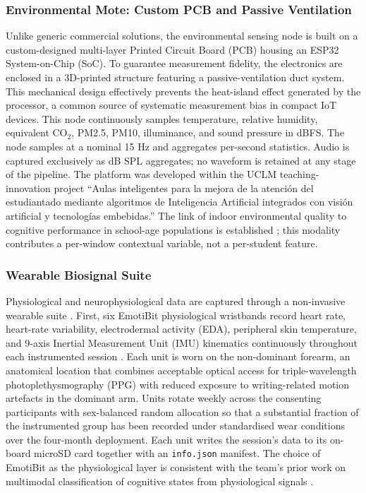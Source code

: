 \subsubsection{Environmental Mote: Custom PCB and Passive Ventilation}

Unlike generic commercial solutions, the environmental sensing node is built on a custom-designed multi-layer Printed Circuit Board (PCB) housing an ESP32 System-on-Chip (SoC). To guarantee measurement fidelity, the electronics are enclosed in a 3D-printed structure featuring a passive-ventilation duct system. This mechanical design effectively prevents the heat-island effect generated by the processor, a common source of systematic measurement bias in compact IoT devices. This node continuously samples temperature, relative humidity, equivalent CO$_2$, PM2.5, PM10, illuminance, and sound pressure in dBFS. The node samples at a nominal 15 Hz and aggregates per-second statistics. Audio is captured exclusively as dB SPL aggregates; no waveform is retained at any stage of the pipeline. The platform was developed within the UCLM teaching-innovation project “Aulas inteligentes para la mejora de la atención del estudiantado mediante algoritmos de Inteligencia Artificial integrados con visión artificial y tecnologías embebidas.” The link of indoor environmental quality to cognitive performance in school-age populations is established \parencite{Wargocki2007_effects,Bako2012_classroom,Satish2012_co2,Petersen2016_classroom,Mendell2013_ventilation,Allen2016_cogfx,Twardella2012_co2_classroom}; this modality contributes a per-window contextual variable, not a per-student feature.

\subsubsection{Wearable Biosignal Suite}

Physiological and neurophysiological data are captured through a non-invasive wearable suite \parencite{hong_advances_2025}. First, six EmotiBit physiological wristbands record heart rate, heart-rate variability, electrodermal activity (EDA), peripheral skin temperature, and 9-axis Inertial Measurement Unit (IMU) kinematics continuously throughout each instrumented session \parencite{di_lascio_unobtrusive_2018, astudillo_capturing_2023}. Each unit is worn on the non-dominant forearm, an anatomical location that combines acceptable optical access for triple-wavelength photoplethysmography (PPG) with reduced exposure to writing-related motion artefacts in the dominant arm. Units rotate weekly across the consenting participants with sex-balanced random allocation so that a substantial fraction of the instrumented group has been recorded under standardised wear conditions over the four-month deployment. Each unit writes the session’s data to its on-board microSD card together with an \texttt{info.json} manifest. The choice of EmotiBit as the physiological layer is consistent with the team’s prior work on multimodal classification of cognitive states from physiological signals \parencite{SanchezReolid2024_eeg_fnirs}. 

